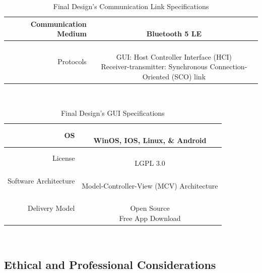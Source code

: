 \documentclass[12pt]{article}
\begin{document}
\begin{table}[h!]
\centering
\caption{Final Design's Communication Link Specifications}
\begin{tabular} {| r | c | }
\hline
\parbox{0.3\linewidth}{\raggedleft
 Communication Medium
} &   \parbox{0.65\linewidth}{\hfill \\
Bluetooth 5 LE
}\\
\hline
\parbox{0.3\linewidth}{\raggedleft
Protocols
} &   \parbox{0.65\linewidth}{\hfill \\
GUI: Host Controller Interface (HCI)\\
Receiver-\>transmitter: Synchronous Connection-Oriented (SCO) link
}\\
\hline
%
%
\end{tabular}
\end{table}
\hfill \\


\begin{table}[h!]
\centering
\caption{Final Design's GUI Specifications}
\begin{tabular} {| r | c | }
\hline
\parbox{0.3\linewidth}{\raggedleft
OS
} &   \parbox{0.65\linewidth}{\hfill \\
WinOS, IOS, Linux, \& Android
}\\
\hline
\parbox{0.3\linewidth}{\raggedleft
License
} &   \parbox{0.65\linewidth}{\hfill \\
 LGPL 3.0
}\\
\hline
\parbox{0.3\linewidth}{\raggedleft
Software Architecture
} &   \parbox{0.65\linewidth}{\hfill \\
Model-Controller-View (MCV) Architecture
}\\
\hline
\hline
\parbox{0.3\linewidth}{\raggedleft
Delivery Model 
} &   \parbox{0.65\linewidth}{\hfill \\
Open Source\\
Free App Download
}\\
\hline
%
%
\end{tabular}
\end{table}
\hfill \\

\subsection{Ethical and Professional Considerations}
\end{document}
